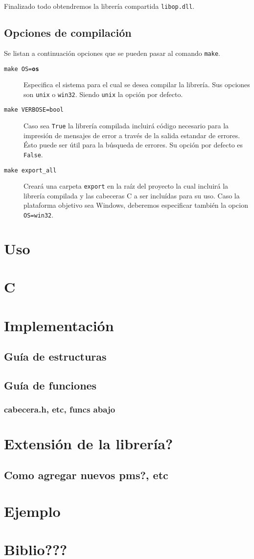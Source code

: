 \documentclass[12pt,a4paper,final]{article}
\begin{document}
			Finalizado todo obtendremos la librería compartida \texttt{libop.dll}.
			
	\subsection{Opciones de compilación}
		Se listan a continuación opciones que se pueden pasar al comando \texttt{make}.
		
		\begin{description}
			\item [\texttt{make OS=\textbf{os}}] Especifica el sistema para el cual se desea compilar la librería.
				Sus opciones son \texttt{unix} o \texttt{win32}. Siendo \texttt{unix} la opción por defecto.
			\item [\texttt{make VERBOSE=bool}] Caso sea \texttt{True} la librería compilada incluirá código 
				necesario para la impresión de mensajes de error a través de la salida estandar de errores. Ésto
				puede ser útil para la búsqueda de errores. Su opción por defecto es \texttt{False}.
			\item [\texttt{make export\_all}] Creará una carpeta \texttt{export} en la raíz del proyecto la 
				cual incluirá la librería compilada y las cabeceras C a ser incluídas para su uso. Caso la
				plataforma objetivo sea Windows, deberemos especificar también la opcion \texttt{OS=win32}.
		\end{description}

\section{Uso}
	\section{C}

\section{Implementación}

	\subsection{Guía de estructuras}

	\subsection{Guía de funciones}
		\subsubsection{cabecera.h, etc, funcs abajo}

\section{Extensión de la librería?}
	\subsection{Como agregar nuevos pms?, etc}

\section{Ejemplo}

\section{Biblio???}

\printindex
\end{document}
